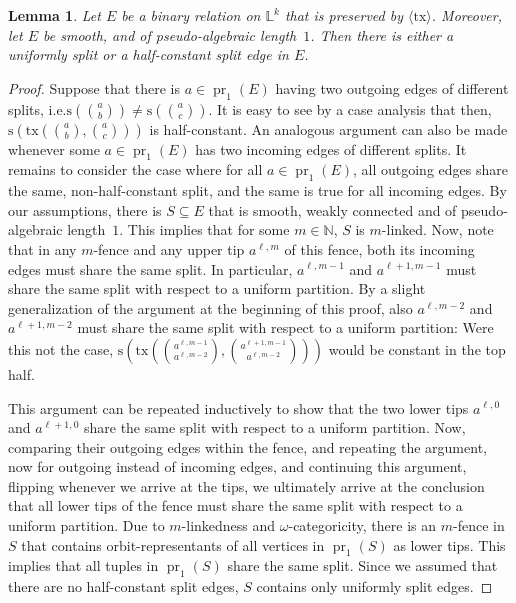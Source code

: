 \documentclass[a4paper,reqno, cleveref]{amsart}
\newtheorem{lemma}[theorem]{Lemma}
\newcommand{\s}{\ensuremath{\mathrm{s}}\xspace}
\DeclareMathOperator{\pr}{pr}
\newcommand{\sL}{\mathbb L}
\newcommand{\bin}{E}
\newcommand{\gen}[1]{\langle#1\rangle}
\newcommand{\tx}{\ensuremath{\mathrm{tx}}\xspace}
\newcommand{\pal}{pseudo-algebraic length~$1$}
\begin{document}
\begin{lemma}\label{phylo:lemma:graph:fence}%
    Let $\bin$ be a binary relation on $\sL^k$ that is preserved by $\gen{\tx}$. 
    Moreover, let $\bin$ be smooth, and of \pal.
    Then there is either a uniformly split or a half-constant split edge in $\bin$.
\end{lemma}

\begin{proof}
    Suppose that there is $a\in\pr_1(\bin)$ having two outgoing edges of different splits, i.e.\;$\s(\binom{a}{b})\neq\s(\binom{a}{c})$. 
    It is easy to see by a case analysis that then, $\s(\tx(\binom{a}{b},\binom{a}{c}))$ is half-constant. 
    An analogous argument can also be made whenever some $a\in\pr_1(\bin)$ has two incoming edges of different splits.
    It remains to consider the case where for all $a\in\pr_1(\bin)$, all outgoing edges share the same, non-half-constant split, and the same is true for all incoming edges.
    By our assumptions, there is $S\subseteq\bin$ that is smooth, weakly connected and of \pal.
    This implies that for some $m\in\mathbb N$, $S$ is $m$-linked.
    Now, note that in any $m$-fence and any upper tip $a^{\ell,m}$ of this fence, both its incoming edges must share the same split.
    In particular, $a^{\ell,m-1}$ and $a^{\ell+1,m-1}$ must share the same split with respect to a uniform partition. 
    By a slight generalization of the argument at the beginning of this proof, also $a^{\ell,m-2}$ and $a^{\ell+1,m-2}$ must share the same split with respect to a uniform partition: Were this not the case, $\s(\tx(\binom{a^{\ell,m-1}}{a^{\ell,m-2}},\binom{a^{\ell+1,m-1}}{a^{\ell,m-2}}))$ would be constant in the top half.
    
    This argument can be repeated inductively to show that the two lower tips $a^{\ell,0}$ and $a^{\ell+1,0}$ share the same split with respect to a uniform partition. 
    Now, comparing their outgoing edges within the fence, and repeating the argument, now for outgoing instead of incoming edges, and continuing this argument, flipping whenever we arrive at the tips, we ultimately arrive at the conclusion that all lower tips of the fence must share the same split with respect to a uniform partition.
    Due to $m$-linkedness and $\omega$-categoricity, there is an $m$-fence in $S$ that contains orbit-representants of all vertices in $\pr_1(S)$ as lower tips. 
    This implies that all tuples in $\pr_1(S)$ share the same split. 
    Since we assumed that there are no half-constant split edges, $S$ contains only uniformly split edges. 
\end{proof}
\end{document}

